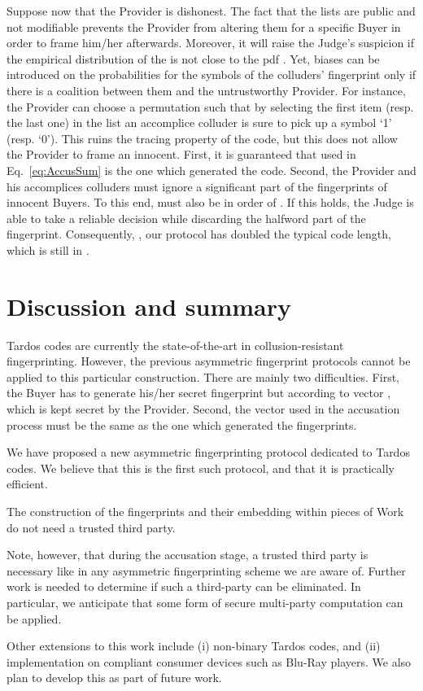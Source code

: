 \documentclass{article}
\begin{document}
Suppose now that the Provider is dishonest. The fact that the 
lists  are public and not
modifiable prevents the Provider from altering them for a specific
Buyer in order to frame him/her afterwards. Moreover, it will raise the
Judge's suspicion if the empirical distribution of the  is not
close to the pdf .  Yet, biases can be introduced on the probabilities
for the symbols of the colluders' fingerprint only if there is a
coalition between them and the untrustworthy Provider. For instance, the
Provider can choose a permutation such that by selecting the first
item (resp. the last one) in the list  an accomplice colluder
is sure to pick up a symbol `1' (resp. `0'). This ruins the tracing
property of the code, but this does not
allow the Provider to frame an innocent.  First, it is guaranteed that
 used in Eq.~\ref{eq:AccusSum} is the one which generated
the code. Second, the Provider and his accomplices colluders must ignore a significant part of the fingerprints of innocent Buyers. To this end,  must also be in order of . If this holds, the Judge is able to take a reliable decision while discarding the halfword part of the fingerprint. Consequently, , our protocol has doubled the typical code length, which is still in .



\section{Discussion and summary}
\label{sec:discussions}

Tardos codes are currently the state-of-the-art in collusion-resistant
fingerprinting. However, the previous asymmetric fingerprint protocols 
cannot be applied to this particular construction. There are mainly two difficulties.
First, the Buyer has to generate his/her secret fingerprint but according to vector , which is kept secret by the Provider. Second, the vector  used in the accusation process must be the same as the one which generated the fingerprints.  




We have proposed a new asymmetric fingerprinting protocol dedicated to Tardos codes.  We believe that this is the first such protocol, and that it is practically efficient.

The construction of the fingerprints and their embedding within pieces of Work do not
need a trusted third party. 

Note, however, that during the accusation stage, a
trusted third party is necessary like in any asymmetric fingerprinting scheme we are aware of. Further work is needed to determine
if such a third-party can be eliminated.  In particular, we anticipate
that some form of secure multi-party computation can be applied.

Other extensions to this work include (i) non-binary Tardos codes, and
(ii) implementation on compliant consumer devices such as Blu-Ray
players.  We also plan to develop this as part of future work.



\end{document}
